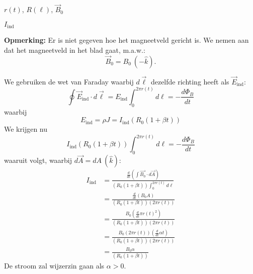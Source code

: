 \begin{description}[labelwidth=1.5cm, leftmargin=!]
    \item[Geg. :]  $r(t)$, $R(\ell)$, $\Vec{B}_0$
    \item[Gevr. :]  $I_{\text{ind}}$
    \item[Opl. :] 
        \textbf{Opmerking:} Er is niet gegeven hoe het magneetveld gericht is. We nemen aan dat het magneetveld in het blad gaat, m\@.a\@.w\@.:
        \begin{equation*}
            \Vec{B}_0 = B_0 \ (-\hat{k}).
        \end{equation*}

        \noindent We gebruiken de wet van Faraday waarbij $d\vec{\ell}$ dezelfde richting heeft als $\vec{E}_{\text{ind}}$:
        \begin{equation*}
            \oint \Vec{E}_{\text{ind}} \cdot d\vec{\ell} = E_{\text{ind}}\int_0^{2\pi r(t)}d\ell= - \frac{d\Phi_B}{dt} 
        \end{equation*}
        waarbij
        \begin{equation*}
            E_{\text{ind}} 
                = \rho J 
                = I_{\text{ind}}\left(R_{0}(1 + \beta t)\right)
        \end{equation*} 
        We krijgen nu
        \begin{equation*}
                I_{\text{ind}}\left(R_{0}(1 + \beta t)\right) \int_0^{2\pi r(t)} d\ell = - \frac{d\Phi_B}{dt}
        \end{equation*}
        waaruit volgt, waarbij $d\vec{A} = dA \ (\hat{k})$:
        \begin{align*}
            I_{\text{ind}} 
                &= \frac{\frac{d}{dt} \left( \int \vec{B_0} \cdot d\vec{A} \right)}{\left(R_{0}(1 + \beta t)\right) \int_0^{2\pi r(t)} d\ell } \\
                &= \frac{\frac{d}{dt} \left( B_0 A \right)}{\left(R_{0}(1 + \beta t)\right) \left(2\pi r(t)\right) } \\
                &= \frac{B_0 \left(\frac{d}{dt} \pi r(t)^2\right)}{\left(R_{0}(1 + \beta t)\right)\left(2\pi r(t)\right)} \\
                &= \frac{B_0 \left(2\pi r(t)\right) \left(\frac{d}{dt} \alpha t\right)}{\left(R_{0}(1 + \beta t)\right)\left(2\pi r(t)\right)} \\
                &= \frac{B_0 \alpha}{\left(R_{0}(1 + \beta t)\right)}
        \end{align*}
        De stroom zal wijzerzin gaan als $\alpha > 0$.
\end{description}

\vspace{1cm}